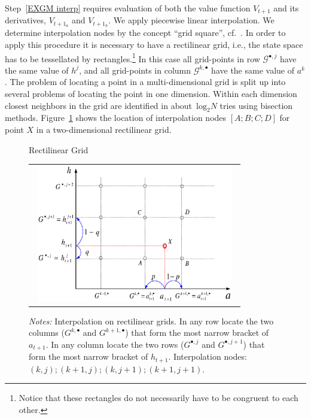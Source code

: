 \documentclass[a4paper,12pt]{article}
\begin{document}
Step~\ref{EXGM interp} requires evaluation of both the value function $V_{t+1}$ and its derivatives, $V_{t+1_{a}}$ and $V_{t+1_{h}}$. We apply piecewise linear interpolation. We determine interpolation nodes by the concept \textquotedblleft grid square\textquotedblright, cf.~. In order to apply this procedure it is necessary to have a rectilinear grid, i.e., the state space has to be tessellated by rectangles.\footnote{Notice that these rectangles do not necessarily have to be congruent to each other.}
In this case all grid-points in row $\mathcal{G}^{\bullet,j}$ have the same value of $h^{j}$, and all grid-points in column $\mathcal{G}^{k,\bullet}$ have the same value of $a^{k}$. The problem of locating a point in a multi-dimensional grid is split up into several problems of locating the point in one dimension. Within each dimension closest neighbors in the grid are identified in about~$\text{log}_{2}N$ tries using bisection methods. Figure~\ref{Rectilinear_Grid} shows the location of interpolation nodes $[A;B;C;D]$ for point $X$ in a two-dimensional rectilinear grid.
\begin{figure}[htbp]
	\caption{Rectilinear Grid}
	\label{Rectilinear_Grid}
	\centering
	\begin{tabular}{c}
	\includegraphics[height=6.0cm, width=9.0cm]{Abbildungen/exo.eps} \\
	\end{tabular}
	\caption*{\footnotesize{\emph{Notes:} Interpolation on rectilinear grids. In any row locate the two columns ($G^{k,\bullet}$ and $G^{k+1,\bullet}$) that form the most narrow bracket of $a_{t+1}$. In any column locate the two rows ($G^{\bullet,j}$ and $G^{\bullet,j+1}$) that form the most narrow bracket of $h_{t+1}$. Interpolation nodes: $(k,j);(k+1,j);(k,j+1);(k+1,j+1)$.}}
\end{figure}
\end{document}
